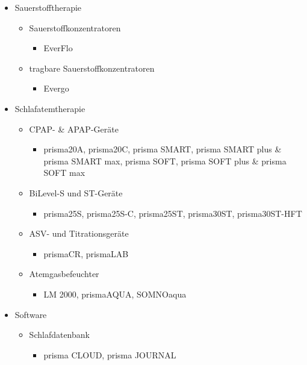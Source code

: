 \documentclass[a4paper, 12pt]{article}
\begin{document}
\begin{itemize}[noitemsep, topsep=0pt]
    \item Sauerstofftherapie
    \begin{itemize}[noitemsep, topsep=0pt]
        \item Sauerstoffkonzentratoren
        \begin{itemize}[noitemsep, topsep=0pt]
            \item EverFlo
        \end{itemize}
        \item tragbare Sauerstoffkonzentratoren
        \begin{itemize}[noitemsep, topsep=0pt]
            \item Evergo
        \end{itemize}
    \end{itemize}

    \item Schlafatemtherapie
    \begin{itemize}[noitemsep, topsep=0pt]
        \item CPAP- \& APAP-Geräte
        \begin{itemize}[noitemsep, topsep=0pt]
            \item prisma20A, prisma20C, prisma SMART, prisma SMART plus \& prisma SMART max, prisma SOFT, prisma SOFT plus \& prisma SOFT max
        \end{itemize}
        \item BiLevel-S und ST-Geräte
        \begin{itemize}[noitemsep, topsep=0pt]
            \item prisma25S, prisma25S-C, prisma25ST, prisma30ST, prisma30ST-HFT
        \end{itemize}
        \item ASV- und Titrationsgeräte
        \begin{itemize}[noitemsep, topsep=0pt]
            \item prismaCR, prismaLAB
        \end{itemize}
        \item Atemgasbefeuchter
        \begin{itemize}[noitemsep, topsep=0pt]
            \item LM 2000, prismaAQUA, SOMNOaqua
        \end{itemize}
    \end{itemize}

    \item Software
    \begin{itemize}[noitemsep, topsep=0pt]
        \item Schlafdatenbank
        \begin{itemize}[noitemsep, topsep=0pt]
            \item prisma CLOUD, prisma JOURNAL
        \end{itemize}
    \end{itemize}


\end{itemize}
\end{document}
